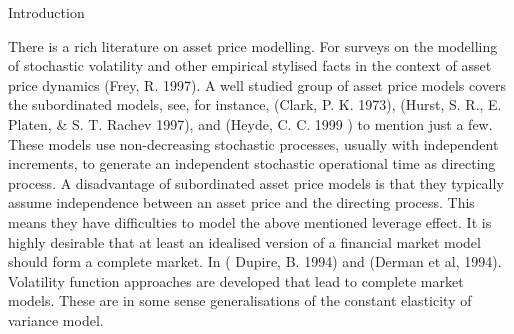 \documentclass[unknownkeysallowed, compress]{beamer}
\theoremstyle{plain}
\begin{document}
\begin{frame}[allowframebreaks]{Introduction}
\par There is a rich literature on asset price modelling. For surveys on the modelling of
stochastic volatility and other empirical stylised facts in the context of asset price
dynamics (Frey, R. 1997). A well studied group of asset price models covers the
subordinated models, see, for instance, (Clark, P. K. 1973), (Hurst, S. R., E. Platen, \& S. T.
Rachev 1997), and (Heyde, C. C. 1999 ) to mention just a few. These models use non-decreasing stochastic processes, usually with independent increments, to generate an
independent stochastic operational time as directing process. A disadvantage of
subordinated asset price models is that they typically assume independence between an
asset price and the directing process. This means they have difficulties to model the
above mentioned leverage effect. It is highly desirable that at least an idealised version of
a financial market model should form a complete market. In ( Dupire, B. 1994) and
(Derman et al, 1994). Volatility function approaches are developed that lead to complete
market models. These are in some sense generalisations of the constant elasticity of
variance model.
\end{frame}
\end{document}
